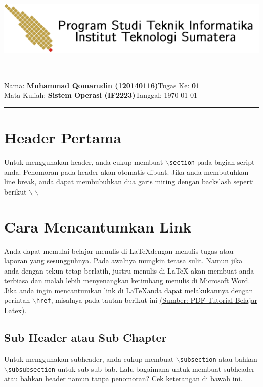 \documentclass[11pt,a4paper]{article}
\newcommand{\stuid}{120140116}
\newcommand{\student}{\textbf{Muhammad Qomarudin (\stuid{})}}
\newcommand{\course}{\textbf{Sistem Operasi (IF2223)}}
\newcommand{\assignment}{\textbf{01}} %
\begin{document}
\thispagestyle{empty}
\begin{center}
	\includegraphics[scale = 0.15]{Figure/ifitera-header.png}
	\vspace{0.1cm}
\end{center}
\noindent
{\large
\rule{17cm}{0.2cm}\\[0.3cm]
Nama: \student \hfill Tugas Ke: \assignment\\[0.1cm]
Mata Kuliah: \course \hfill Tanggal: \today\\
\rule{17cm}{0.05cm}
\vspace{0.1cm}
}


\section{Header Pertama}
    Untuk menggunakan header, anda cukup membuat $\backslash${\tt{section}} pada bagian script anda. Penomoran pada header akan otomatis dibuat. Jika anda membutuhkan line break, anda dapat membubuhkan dua garis miring dengan backslash seperti berikut $\backslash\backslash$

\section{Cara Mencantumkan Link}
    Anda dapat memulai belajar menulis di \LaTeX dengan menulis tugas atau laporan yang sesungguhnya. Pada awalnya mungkin terasa sulit. Namun jika anda dengan tekun tetap berlatih, justru menulis di LaTeX akan membuat anda terbiasa dan malah lebih menyenangkan ketimbang menulis di Microsoft Word.\\
    Jika anda ingin mencantumkan link di \LaTeX anda dapat melakukannya dengan perintah $\backslash${\tt{href}}, misalnya pada tautan berikut ini \href{http://aldi_tob_2000.staff.gunadarma.ac.id/Downloads/files/17359/Membuat+dokumen+dengan+latex.pdf}{(Sumber: PDF Tutorial Belajar Latex)}.
    
\subsection{Sub Header atau Sub Chapter}
     Untuk menggunakan subheader, anda cukup membuat $\backslash${\tt{subsection}} atau bahkan  $\backslash${\tt{subsubsection}} untuk sub-sub bab. Lalu bagaimana untuk membuat subheader atau bahkan header namun tanpa penomoran? Cek keterangan di bawah ini.
\end{document}
